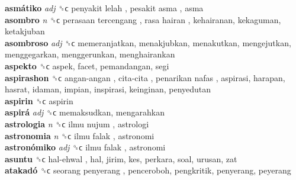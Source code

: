 \textbf{asmátiko} \emph{adj}  ␝ϲ   penyakit lelah ,  pesakit asma , asma  \\
\textbf{asombro} \emph{n}  ␝ϲ   perasaan tercengang ,  rasa hairan , kehairanan, kekaguman, ketakjuban  \\
\textbf{asombroso} \emph{adj}  ␝ϲ  memeranjatkan, menakjubkan, menakutkan, mengejutkan, menggegarkan, menggerunkan, menghairankan  \\
\textbf{aspekto} ␝ϲ  aspek, facet, pemandangan, segi  \\
\textbf{aspirashon} ␝ϲ   angan-angan ,  cita-cita ,  penarikan nafas , aspirasi, harapan, hasrat, idaman, impian, inspirasi, keinginan, penyedutan  \\
\textbf{aspirin} ␝ϲ  aspirin  \\
\textbf{aspirá} \emph{adj}  ␝ϲ  memaksudkan, mengarahkan  \\
\textbf{astrologia} \emph{n}  ␝ϲ   ilmu nujum , astrologi  \\
\textbf{astronomia} \emph{n}  ␝ϲ   ilmu falak , astronomi  \\
\textbf{astronómiko} \emph{adj}  ␝ϲ   ilmu falak , astronomi  \\
\textbf{asuntu} ␝ϲ   hal-ehwal , hal, jirim, kes, perkara, soal, urusan, zat  \\
\textbf{atakadó} ␝ϲ   seorang penyerang , penceroboh, pengkritik, penyerang, peyerang  \\
